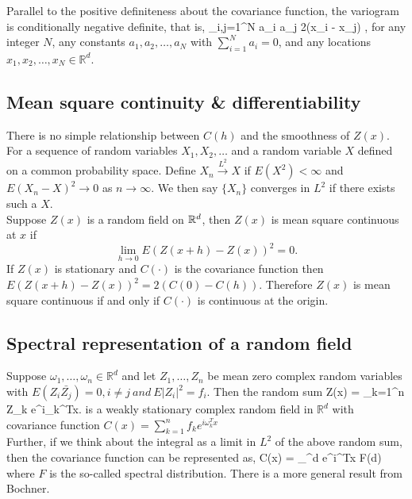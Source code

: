 Parallel to the positive definiteness about the covariance function, the variogram is conditionally negative definite, that is,
\beq
\sum_{i,j=1}^{N} a_i a_j 2\gamma(x_i - x_j) ,
\eeq
for any integer $N$, any constants $a_1, a_2, \ldots, a_N$ with $\sum_{i=1}^N a_i = 0$, and any locations $x_1, x_2, \ldots, x_N \in \mathbb{R}^d$.


\subsection{Mean square continuity \& differentiability}

There is no simple relationship between $C(h)$ and the smoothness of $Z(x)$. For a sequence of random variables $X_1, X_2,\ldots$ and a random variable $X$ defined on a common probability space. Define $X_n\overset{L^2}\to X$ if $E(X^2)<\infty$ and $E(X_n - X)^2\to 0$ as $n \rightarrow \infty$. We then say $\{X_n\}$ converges in $L^2$ if there exists such a $X$.\\

Suppose $Z(x)$ is a random field on $\mathbb{R}^d$, then $Z(x)$ is mean square continuous at $x$ if
\[
\lim_{h\to 0} E(Z(x+h)-Z(x))^2 =0.
\]
If $Z(x)$ is stationary and $C(\cdot)$ is the covariance function then $E(Z(x+h)-Z(x))^2=2(C(0)-C(h))$. Therefore $Z(x)$ is mean square continuous if and only if $C(\cdot)$ is continuous at the origin.

\subsection{Spectral representation of a random field}

Suppose $\omega_1,\ldots, \omega_n \in \mathbb{R}^d$ and let $Z_1, \ldots, Z_n$ be mean zero complex random variables with  $E(Z_i\bar{Z_j})=0, i\ne j\ and\ E|Z_i|^2=f_i$. Then the random sum
\beq Z(x) = \sum_{k=1}^n Z_k e^{i\omega_k^Tx}.\eeq
is a weakly stationary complex random field in $\mathbb{R}^d$ with covariance function $C(x) = \sum_{k=1}^n f_k e^{i\omega_k^Tx}$\\

Further, if we think about the integral as a limit in $L^2$ of the above random sum, then the covariance function can be represented as,
\beq 
C(x) = \int_{^d} e^{i\omega^Tx} F(d\omega)
\eeq
where $F$ is the so-called spectral distribution. There is a more general result from Bochner.

